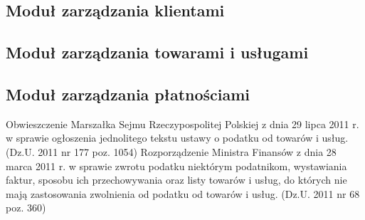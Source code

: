 \documentclass[12pt, a4paper]{article}
\begin{document}
\subsection{Moduł zarządzania klientami}
\subsection{Moduł zarządzania towarami i usługami}
\subsection{Moduł zarządzania płatnościami}

\newpage
\begin{thebibliography}{szerokosc}
Obwieszczenie Marszałka Sejmu Rzeczypospolitej Polskiej z
dnia 29 lipca 2011 r. w sprawie ogłoszenia jednolitego tekstu ustawy o podatku
od towarów i usług. (Dz.U. 2011 nr 177 poz. 1054) 
Rozporządzenie Ministra Finansów z dnia 28 marca
2011 r.
w sprawie zwrotu podatku niektórym podatnikom, wystawiania faktur, sposobu ich
przechowywania oraz listy towarów i usług, do których nie mają zastosowania
zwolnienia od podatku od towarów i usług. (Dz.U. 2011 nr 68 poz. 360)
\end{thebibliography}
\end{document}
